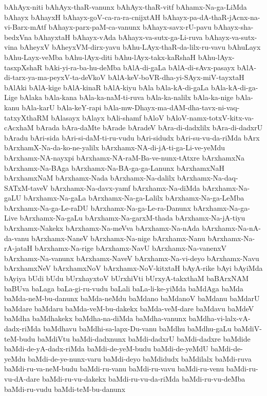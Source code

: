 {bAhAyx-niti
bAhAyx-thaR-vanunx
bAhAyx-thaR-vitf
bAhamx-Na-ga-LiMda
bAhayx
bAhayxH
bAhayx-goV-ca-ra-ra-cnijxtAH
bAhayx-pa-dA-thaR-jAcnx-na-vi-Barx-mAtf
bAhayx-parx-paM-ca-vanunx
bAhayx-savx-rU-pavu
bAhayx-sha-bedxVna
bAhayxtaH
bAhayx-vAda
bAhayx-va-sutx-ga-Li-ruva
bAhayx-va-sutx-vina
bAheyxV
bAheyxVM-dirx-yavu
bAhu-LAyx-thaR-da-lilx-ru-vavu
bAhuLayx
bAhu-Layx-veMba
bAhu-lAyx-diti
bAhu-lAyx-takx-kaRshaH
bAhu-lAyx-tasxpXshaR
bAki-yi-ra-ba-hu-deMba
bAlA-di-gaLa
bAlA-di-sAvx-pasayx
bAlA-di-tarx-ya-ma-peyxV-ta-deVkoV
bAlA-keV-boVR-dha-yi-SAyx-miV-tayxtaH
bAlAki
bAlA-kige
bAlA-kinaR
bAlA-kiyu
bAla
bAla-kA-di-gaLa
bAla-kA-di-ga-Lige
bAlaka
bAla-kana
bAla-ka-naM-ti-ruva
bAla-ka-nalilx
bAla-ka-nige
bAla-kanu
bAla-karU
bAla-keY-rapi
bAla-mw-Dhayx-ma-dAM-dha-tavx-ni-vaq-tatxyXthaRM
bAlasayx
bAlayx
bAli-shamf
bAloV
bAloV-namx-totxV-kitx-va-cAcxhaM
bArada
bAra-daMte
bArade
bAradeV
bAra-di-dadxlilx
bAra-di-dadxrU
bAradu
bAri-sida
bAri-si-daM-ti-ru-vudu
bAri-sidudx
bAri-su-vu-da-riMda
bArx
bArxhamX-Na-da-ko-ne-yalilx
bArxhamx-NA-di-jA-ti-ga-Li-ve-yeMdu
bArxhamx-NA-nayxpi
bArxhamx-NA-raM-Ba-ve-nunx-tAtxre
bArxhamxNa
bArxhamx-Na-BAga
bArxhamx-Na-BA-ga-ga-Lanunx
bArxhamxNaH
bArxhamxNaM
bArxhamx-Nada
bArxhamx-Na-dalilx
bArxhamx-Na-daq-SATxM-taveV
bArxhamx-Na-davx-yamf
bArxhamx-Na-diMda
bArxhamx-Na-gaLU
bArxhamx-Na-gaLa
bArxhamx-Na-ga-Lalilx
bArxhamx-Na-ga-LeMba
bArxhamx-Na-ga-Le-raDU
bArxhamx-Na-ga-Le-ra-Danunx
bArxhamx-Na-ga-Live
bArxhamx-Na-gaLu
bArxhamx-Na-garxM-thada
bArxhamx-Na-jA-tiyu
bArxhamx-Nakekx
bArxhamx-Na-meVva
bArxhamx-Na-nAda
bArxhamx-Na-nA-da-vanu
bArxhamx-NaneV
bArxhamx-Na-nige
bArxhamx-Nanu
bArxhamx-Na-rA-jataH
bArxhamx-Na-rige
bArxhamx-NavU
bArxhamx-Na-vanenxV
bArxhamx-Na-vanunx
bArxhamx-NaveV
bArxhamx-Na-vi-deyo
bArxhamx-Navu
bArxhamxNeV
bArxhamxNoV
bArxhamx-NoV-kitxtaH
bAyA-rike
bAyi
bAyiMda
bAyiya
bUdi
bUdu
bUrxhayxtoV
bUrxhiVti
bUrxyA-takxthaM
baBArxNAM
baBUva
baLaga
baLa-gi-ru-vudu
baLali
baLa-li-ke-yiMda
baMdAga
baMda
baMda-neM-bu-danunx
baMda-neMdu
baMdano
baMdanoV
baMdanu
baMdarU
baMdare
baMdaru
baMda-veM-bu-dakekx
baMda-veM-dare
baMdavu
baMdeV
baMdha
baMdhakekx
baMdha-na-diMda
baMdha-vanunx
baMdha-vi-lalx-vA-dadx-riMda
baMdhavu
baMdhi-sa-lapx-Du-vanu
baMdhu
baMdhu-gaLu
baMdiV-teM-budu
baMdiVtu
baMdi-dadxnunx
baMdi-dadxrU
baMdi-dadxre
baMdide
baMdi-de-yA-dadx-riMda
baMdi-de-yeM-budu
baMdi-de-yeMdU
baMdi-de-yeMdu
baMdi-de-ye-nunx-varu
baMdi-deyo
baMdidudx
baMdilalx
baMdi-ruva
baMdi-ru-va-neM-budu
baMdi-ru-vanu
baMdi-ru-vavu
baMdi-ru-venu
baMdi-ru-vu-dA-dare
baMdi-ru-vu-dakekx
baMdi-ru-vu-da-riMda
baMdi-ru-vu-deMba
baMdi-ru-vudu
baMdi-teM-bu-danunx
}
